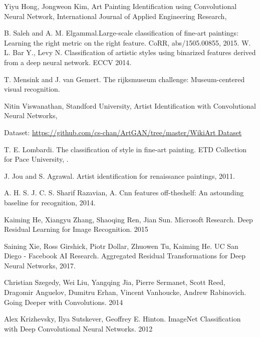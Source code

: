 \documentclass{article}
\begin{document}
\begin{thebibliography}{1}
	
	Yiyu Hong, Jongweon Kim, \newblock  Art Painting Identification using Convolutional Neural Network, \newblock International Journal of Applied Engineering Research, 
	
	B. Saleh and A. M. Elgammal.\newblock  Large-scale classification
	of fine-art paintings: Learning the right metric on the right
	feature. \newblock CoRR, abs/1505.00855, 2015.
	W. L. Bar Y., Levy N. Classification of artistic styles using binarized features derived from a deep neural network.
	ECCV 2014.
	
	T. Mensink and J. van Gemert. \newblock The rijksmuseum challenge:
	Museum-centered visual recognition. 
	
	
	Nitin Viswanathan, Standford University,
	\newblock Artist Identification with Convolutional Neural Networks, 
	
	Dataset:
	\url{https://github.com/cs-chan/ArtGAN/tree/master/WikiArt Dataset}
		
	T. E. Lombardi. \newblock The classification of style in fine-art painting. ETD Collection for Pace University, .
	
	J. Jou and S. Agrawal. Artist identification for renaissance
	paintings, 2011.
	
	A. H. S. J. C. S. Sharif Razavian, A. Cnn features off-theshelf: An astounding baseline for recognition, 2014.
	
	Kaiming He, Xiangyu Zhang, Shaoqing Ren, Jian Sun. Microsoft Research. 
	Deep Residual Learning for Image Recognition. 2015
	
	Saining Xie, Ross Girshick, Piotr Dollar, Zhuowen Tu, Kaiming He. UC San Diego - Facebook AI Research. Aggregated Residual Transformations for Deep Neural Networks, 2017.
	
	Christian Szegedy, Wei Liu, Yangqing Jia, Pierre Sermanet, Scott Reed, Dragomir Anguelov, Dumitru Erhan, Vincent Vanhoucke, Andrew Rabinovich. Going Deeper with Convolutions. 2014
	
	Alex Krizhevsky, Ilya Sutskever, Geoffrey E. Hinton. ImageNet Classification with Deep Convolutional
	Neural Networks. 2012


\end{thebibliography}
\end{document}

